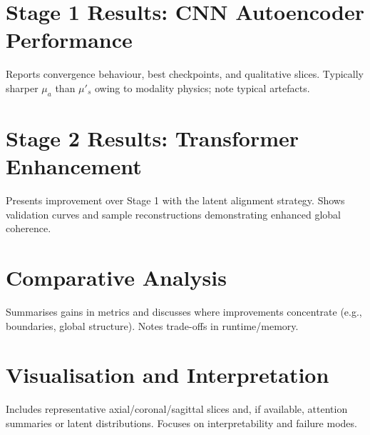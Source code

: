 \section{Stage 1 Results: CNN Autoencoder Performance}

Reports convergence behaviour, best checkpoints, and qualitative slices. Typically sharper $\mu_a$ than $\mu'_s$ owing to modality physics; note typical artefacts.


\section{Stage 2 Results: Transformer Enhancement}

Presents improvement over Stage 1 with the latent alignment strategy. Shows validation curves and sample reconstructions demonstrating enhanced global coherence.


\section{Comparative Analysis}

Summarises gains in metrics and discusses where improvements concentrate (e.g., boundaries, global structure). Notes trade-offs in runtime/memory.


\section{Visualisation and Interpretation}

Includes representative axial/coronal/sagittal slices and, if available, attention summaries or latent distributions. Focuses on interpretability and failure modes.

